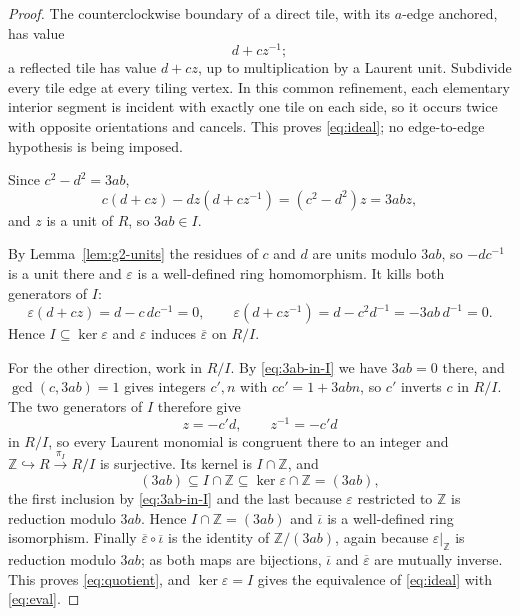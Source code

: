\documentclass[11pt]{amsart}
\theoremstyle{definition}
\theoremstyle{remark}
\newcommand{\Z}{\mathbb Z}
\begin{document}
\begin{proof}
The counterclockwise boundary of a direct tile, with its $a$-edge anchored,
has value
\[
                    d+cz^{-1};
\]
a reflected tile has value $d+cz$, up to multiplication by a Laurent unit.
Subdivide every tile edge at every tiling vertex.  In this common refinement,
each elementary interior segment is incident with exactly one tile on each
side, so it occurs twice with opposite orientations and cancels.  This proves
\eqref{eq:ideal}; no edge-to-edge hypothesis is being imposed.

Since $c^2-d^2=3ab$,
\begin{equation}\label{eq:3ab-in-I}
 c(d+cz)-dz(d+cz^{-1})=(c^2-d^2)z=3abz,
\end{equation}
and $z$ is a unit of $R$, so $3ab\in I$.

By Lemma~\ref{lem:g2-units} the residues of $c$ and $d$ are units modulo
$3ab$, so $-dc^{-1}$ is a unit there and $\varepsilon$ is a well-defined ring
homomorphism.  It kills both generators of $I$:
\[
 \varepsilon(d+cz)=d-c\,dc^{-1}=0,\qquad
 \varepsilon(d+cz^{-1})=d-c^2d^{-1}=-3ab\,d^{-1}=0 .
\]
Hence $I\subseteq\ker\varepsilon$ and $\varepsilon$ induces
$\overline\varepsilon$ on $R/I$.

For the other direction, work in $R/I$.  By \eqref{eq:3ab-in-I} we have
$3ab=0$ there, and $\gcd(c,3ab)=1$ gives integers $c',n$ with $cc'=1+3abn$,
so $c'$ inverts $c$ in $R/I$.  The two generators of $I$ therefore give
\[
             z=-c'd,\qquad z^{-1}=-c'd
\]
in $R/I$, so every Laurent monomial is congruent there to an integer and
$\Z\hookrightarrow R\xrightarrow{\pi_I}R/I$ is surjective.  Its
kernel is $I\cap\Z$, and
\[
 (3ab)\subseteq I\cap\Z\subseteq\ker\varepsilon\cap\Z=(3ab),
\]
the first inclusion by \eqref{eq:3ab-in-I} and the last because
$\varepsilon$ restricted to $\Z$ is reduction modulo $3ab$.  Hence
$I\cap\Z=(3ab)$ and $\overline\iota$ is a well-defined ring isomorphism.
Finally $\overline\varepsilon\circ\overline\iota$ is the identity of
$\Z/(3ab)$, again because $\varepsilon|_\Z$ is reduction modulo $3ab$;
as both maps are bijections, $\overline\iota$ and $\overline\varepsilon$ are
mutually inverse.  This proves \eqref{eq:quotient}, and $\ker\varepsilon=I$
gives the equivalence of \eqref{eq:ideal} with \eqref{eq:eval}.
\end{proof}
\end{document}

